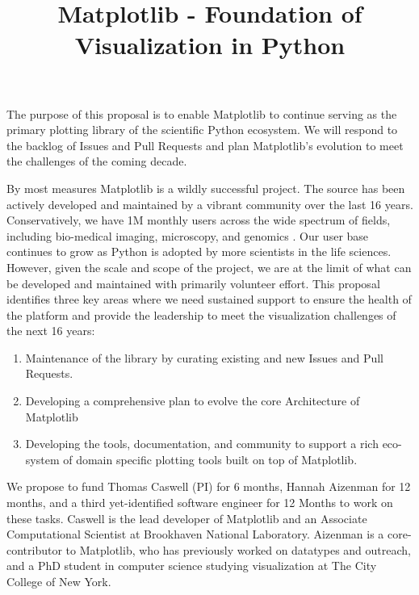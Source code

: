 \documentclass[11pt]{article}  %
\begin{document}
\title{Matplotlib - Foundation of Visualization in Python}
\author{}
\maketitle


The purpose of this proposal is to enable Matplotlib to continue
serving as the primary plotting library of the scientific Python
ecosystem.  We will respond to the backlog of Issues and Pull
Requests and plan Matplotlib's evolution to meet the challenges
of the coming decade.

By most measures Matplotlib is a wildly successful project.  The
source has been actively developed and maintained by a vibrant
community over the last 16 years.  Conservatively, we have 1M monthly
users across the wide spectrum of fields, including bio-medical
imaging, microscopy, and genomics
\cite{Carpenter2006,Wolf2018,10.7717/peerj.453}
\cite{Segata2011,10.1371/journal.pgen.1000695,HASHIMSHONY2012666,
  10.1093/bioinformatics/bts480,Carlile2014,Laganowsky2014,Jiangaac9462,
  10.3389/fninf.2014.00014}.  Our user base continues to grow as
Python is adopted by more scientists in the life sciences.  However,
given the scale and scope of the project, we are at the limit of what
can be developed and maintained with primarily volunteer effort. This
proposal identifies three key areas where we need sustained support to
ensure the health of the platform and provide the leadership to meet
the visualization challenges of the next 16 years:

\begin{enumerate}[label=\alph*)]
  \item Maintenance of the library by curating existing and new Issues
    and Pull Requests.
  \item Developing a comprehensive plan to evolve the core Architecture
    of Matplotlib
  \item Developing the tools, documentation, and community to support
    a rich eco-system of domain specific plotting tools built on top
    of Matplotlib.
\end{enumerate}

We propose to fund Thomas Caswell (PI) for 6 months, Hannah Aizenman
for 12 months, and a third yet-identified software engineer for 12
Months to work on these tasks.  Caswell is the lead developer of
Matplotlib and an Associate Computational Scientist at Brookhaven
National Laboratory.  Aizenman is a core-contributor to Matplotlib,
who has previously worked on datatypes and outreach, and a PhD student
in computer science studying visualization at The City College of New
York.
\end{document}
